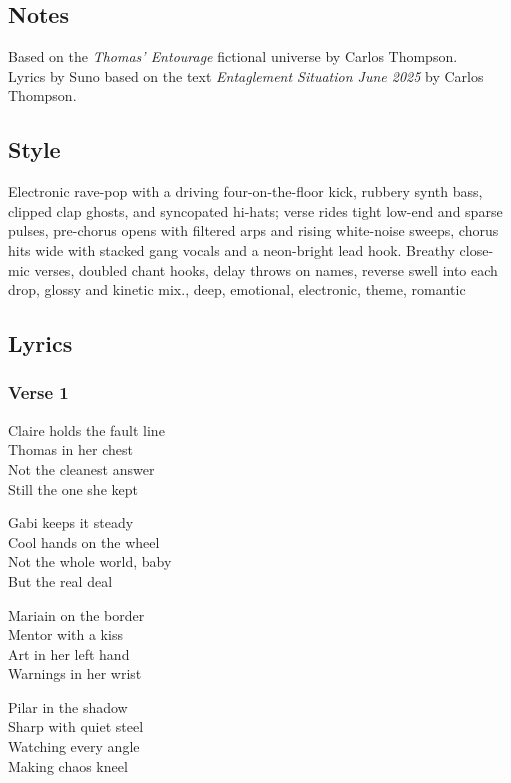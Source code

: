 \subsection{Notes}\label{notes-15}

Based on the \emph{Thomas' Entourage} fictional universe by Carlos
Thompson.\\
Lyrics by Suno based on the text \emph{Entaglement Situation June 2025}
by Carlos Thompson.

\subsection{Style}\label{style-15}

Electronic rave-pop with a driving four-on-the-floor kick, rubbery synth
bass, clipped clap ghosts, and syncopated hi-hats; verse rides tight
low-end and sparse pulses, pre-chorus opens with filtered arps and
rising white-noise sweeps, chorus hits wide with stacked gang vocals and
a neon-bright lead hook. Breathy close-mic verses, doubled chant hooks,
delay throws on names, reverse swell into each drop, glossy and kinetic
mix., deep, emotional, electronic, theme, romantic

\subsection{Lyrics}\label{lyrics-15}

\subsubsection{Verse 1}\label{verse-1-11}

Claire holds the fault line\\
Thomas in her chest\\
Not the cleanest answer\\
Still the one she kept

Gabi keeps it steady\\
Cool hands on the wheel\\
Not the whole world, baby\\
But the real deal

Mariain on the border\\
Mentor with a kiss\\
Art in her left hand\\
Warnings in her wrist

Pilar in the shadow\\
Sharp with quiet steel\\
Watching every angle\\
Making chaos kneel

